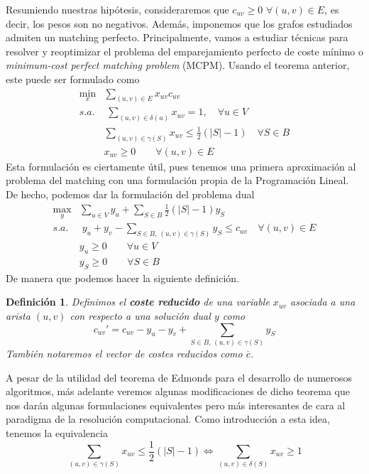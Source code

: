 \documentclass[twoside,a4paper,openright,12pt,tikz]{book}
\newtheorem{defi}{Definici\'on}[section]
\begin{document}
Resumiendo nuestras hipótesis, consideraremos que $c_{uv}\geq 0$ $\forall (u,v)\in E$, es decir, los pesos son no negativos. Además, imponemos que los grafos estudiados admiten un matching perfecto. Principalmente, vamos a estudiar técnicas para resolver y reoptimizar el problema del emparejamiento perfecto de coste mínimo o \textit{minimum-cost perfect matching problem} (MCPM). Usando el teorema anterior, este puede ser formulado como
\begin{align*}
\min_x & \sum_{(u,v) \in E}x_{uv}c_{uv}\\
s.a.&\;\sum_{(u,v)\in\delta(u)} x_{uv} = 1, \quad \forall u \in V\\
&\sum_{(u,v)\in \gamma(S)} x_{uv} \leq \frac{1}{2}(|S|-1)\quad \forall S \in B	\\
&x_{uv} \geq 0 \qquad \forall(u,v)\in E
\end{align*}
Esta formulación es ciertamente útil, pues tenemos una primera aproximación al problema del matching con una formulación propia de la Programación Lineal. De hecho, podemos dar la formulación del problema dual
\begin{align*}
\max_y & \sum_{u\in V}y_u + \sum_{S\in B}\frac{1}{2}(|S|-1)y_S\\
s.a.&\;y_u+y_v - \sum_{S\in B,\,(u,v)\in \gamma(S)} y_S \leq c_{uv} \quad \forall (u,v)\in E\\
&y_u \geq 0 \qquad \forall u\in V\\
&y_S \geq 0 \qquad \forall S\in B
\end{align*}
De manera que podemos hacer la siguiente definición.
\begin{defi}
Definimos el \textbf{coste reducido} de una variable $x_{uv}$ asociada a una arista $(u,v)$ con respecto a una solución dual $y$ como
$$
c_{uv}' = c_{uv} -y_u - y_v + \sum_{S\in B,\,(u,v)\in \gamma(S)}y_S 
$$
También notaremos el vector de costes reducidos como $\overline{c}$.
\end{defi}

A pesar de la utilidad del teorema de Edmonds para el desarrollo de numerosos algoritmos, más adelante veremos algunas modificaciones de dicho teorema que nos darán algunas formulaciones equivalentes pero más interesantes de cara al paradigma de la resolución computacional. Como introducción a esta idea, tenemos la equivalencia
$$
\sum_{(u,v)\in \gamma(S)} x_{uv} \leq \frac{1}{2}(|S|-1) \Leftrightarrow \sum_{(u,v)\in \delta(S)} x_{uv} \geq 1
$$
\newpage
\end{document}
